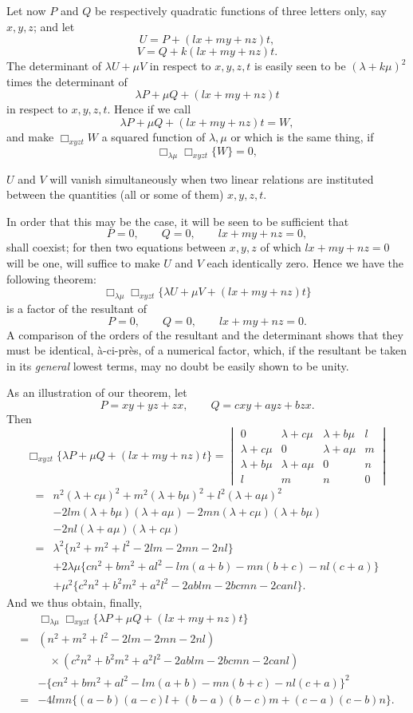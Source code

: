 \documentclass[11pt]{article}
\newcommand{\sourcepage}[1]{\marginpar{\scriptsize p.~#1}}
\begin{document}
{{Let now $P$ and $Q$ be respectively quadratic functions of three letters only, say $x,y,z$; and let
\[
U=P+(lx+my+nz)t,
\]
\[
V=Q+k(lx+my+nz)t.
\]
The determinant of $\lambda U+\mu V$ in respect to $x,y,z,t$ is easily seen to be $(\lambda+k\mu)^2$ times the determinant of
\[
\lambda P+\mu Q+(lx+my+nz)t
\]
in respect to $x,y,z,t$. Hence if we call
\[
\lambda P+\mu Q+(lx+my+nz)t=W,
\]
and make $\Box_{xyzt}W$ a squared function of $\lambda,\mu$ or which is the same thing, if
\[
\Box_{\lambda\mu}\Box_{xyzt}\{W\}=0,
\]

\sourcepage{140}
$U$ and $V$ will vanish simultaneously when two linear relations are instituted between the quantities (all or some of them) $x,y,z,t$.

In order that this may be the case, it will be seen to be sufficient that
\[
P=0,\qquad Q=0,\qquad lx+my+nz=0,
\]
shall coexist; for then two equations between $x,y,z$ of which $lx+my+nz=0$ will be one, will suffice to make $U$ and $V$ each identically zero. Hence we have the following theorem:
\[
\Box_{\lambda\mu}\Box_{xyzt}\{\lambda U+\mu V+(lx+my+nz)t\}
\]
is a factor of the resultant of
\[
P=0,\qquad Q=0,\qquad lx+my+nz=0.
\]
A comparison of the orders of the resultant and the determinant shows that they must be identical, \`a-ci-pr\`es, of a numerical factor, which, if the resultant be taken in its \emph{general} lowest terms, may no doubt be easily shown to be unity.

As an illustration of our theorem, let
\[
P=xy+yz+zx,\qquad
Q=cxy+ayz+bzx.
\]
Then
\[
\Box_{xyzt}\{\lambda P+\mu Q+(lx+my+nz)t\}
=
\begin{vmatrix}
0&\lambda+c\mu&\lambda+b\mu&l\\
\lambda+c\mu&0&\lambda+a\mu&m\\
\lambda+b\mu&\lambda+a\mu&0&n\\
l&m&n&0
\end{vmatrix}
\]
\[
\begin{aligned}
={}&n^2(\lambda+c\mu)^2+m^2(\lambda+b\mu)^2+l^2(\lambda+a\mu)^2\\
&-2lm(\lambda+b\mu)(\lambda+a\mu)
-2mn(\lambda+c\mu)(\lambda+b\mu)\\
&-2nl(\lambda+a\mu)(\lambda+c\mu)\\
={}&\lambda^2\{n^2+m^2+l^2-2lm-2mn-2nl\}\\
&+2\lambda\mu\{cn^2+bm^2+al^2-lm(a+b)-mn(b+c)-nl(c+a)\}\\
&+\mu^2\{c^2n^2+b^2m^2+a^2l^2-2ablm-2bcmn-2canl\}.
\end{aligned}
\]
And we thus obtain, finally,
\[
\begin{aligned}
&\Box_{\lambda\mu}\Box_{xyzt}\{\lambda P+\mu Q+(lx+my+nz)t\}\\
={}&(n^2+m^2+l^2-2lm-2mn-2nl)\\
&\quad\times(c^2n^2+b^2m^2+a^2l^2-2ablm-2bcmn-2canl)\\
&-\{cn^2+bm^2+al^2-lm(a+b)-mn(b+c)-nl(c+a)\}^2\\
={}&-4lmn\{(a-b)(a-c)l+(b-a)(b-c)m+(c-a)(c-b)n\}.
\end{aligned}
\]

}}
\end{document}
